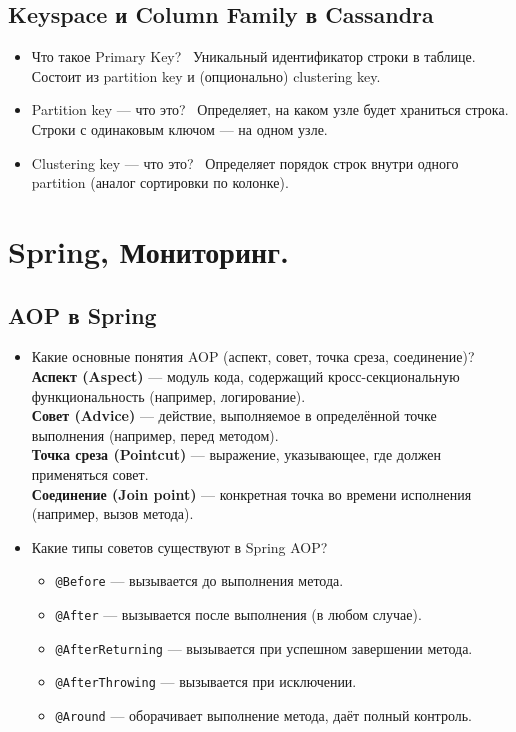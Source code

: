 \documentclass[a4paper,14pt]{article}
\begin{document}
\subsection{Keyspace и Column Family в Cassandra}

\begin{itemize}
\item Что такое Primary Key? \
Уникальный идентификатор строки в таблице. Состоит из partition key и (опционально) clustering key.

\item Partition key — что это? \
Определяет, на каком узле будет храниться строка. Строки с одинаковым ключом — на одном узле.

\item Clustering key — что это? \
Определяет порядок строк внутри одного partition (аналог сортировки по колонке).
\end{itemize}

\section{Spring, Мониторинг.}
\subsection{AOP в Spring}

\begin{itemize}
\item Какие основные понятия AOP (аспект, совет, точка среза, соединение)? \\
\textbf{Аспект (Aspect)} — модуль кода, содержащий кросс-секциональную функциональность (например, логирование). \\
\textbf{Совет (Advice)} — действие, выполняемое в определённой точке выполнения (например, перед методом). \\
\textbf{Точка среза (Pointcut)} — выражение, указывающее, где должен применяться совет. \\
\textbf{Соединение (Join point)} — конкретная точка во времени исполнения (например, вызов метода).

\item Какие типы советов существуют в Spring AOP? \\
\begin{itemize}
\item \texttt{@Before} — вызывается до выполнения метода.
\item \texttt{@After} — вызывается после выполнения (в любом случае).
\item \texttt{@AfterReturning} — вызывается при успешном завершении метода.
\item \texttt{@AfterThrowing} — вызывается при исключении.
\item \texttt{@Around} — оборачивает выполнение метода, даёт полный контроль.
\end{itemize}
\end{itemize}
\end{document}
